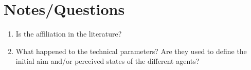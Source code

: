\section{Notes/Questions}

\begin{enumerate}
\item Is the affiliation in the literature?
\item What happened to the technical parameters? Are they used to define the initial aim and/or perceived states of the different agents?
\end{enumerate}

%
%





